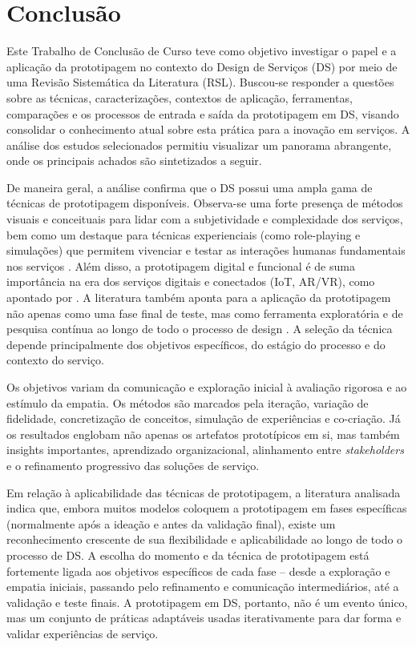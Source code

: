 \chapter[Conclusão]{Conclusão}

Este Trabalho de Conclusão de Curso teve como objetivo investigar o papel e a aplicação da prototipagem no contexto do Design de Serviços (DS) por meio de uma Revisão Sistemática da Literatura (RSL). Buscou-se responder a questões sobre as técnicas, caracterizações, contextos de aplicação, ferramentas, comparações e os processos de entrada e saída da prototipagem em DS, visando consolidar o conhecimento atual sobre esta prática para a inovação em serviços. A análise dos estudos selecionados permitiu visualizar um panorama abrangente, onde os principais achados são sintetizados a seguir.

De maneira geral, a análise confirma que o DS possui uma ampla gama de técnicas de prototipagem disponíveis. Observa-se uma forte presença de métodos visuais e conceituais para lidar com a subjetividade e complexidade dos serviços, bem como um destaque para técnicas experienciais (como role-playing e simulações) que permitem vivenciar e testar as interações humanas fundamentais nos serviços \cite{soto2023prototyping, seko2024transitions}. Além disso, a prototipagem digital e funcional é de suma importância na era dos serviços digitais e conectados (IoT, AR/VR), como apontado por . A literatura também aponta para a aplicação da prototipagem não apenas como uma fase final de teste, mas como ferramenta exploratória e de pesquisa contínua ao longo de todo o processo de design \cite{soto2023prototyping, paust2025integrative}. A seleção da técnica depende principalmente dos objetivos específicos, do estágio do processo e do contexto do serviço.

Os objetivos variam da comunicação e exploração inicial à avaliação rigorosa e ao estímulo da empatia. Os métodos são marcados pela iteração, variação de fidelidade, concretização de conceitos, simulação de experiências e co-criação. Já os resultados englobam não apenas os artefatos prototípicos em si, mas também insights importantes, aprendizado organizacional, alinhamento entre \textit{stakeholders} e o refinamento progressivo das soluções de serviço.

Em relação à aplicabilidade das técnicas de prototipagem, a literatura analisada indica que, embora muitos modelos coloquem a prototipagem em fases específicas (normalmente após a ideação e antes da validação final), existe um reconhecimento crescente de sua flexibilidade e aplicabilidade ao longo de todo o processo de DS. A escolha do momento e da técnica de prototipagem está fortemente ligada aos objetivos específicos de cada fase – desde a exploração e empatia iniciais, passando pelo refinamento e comunicação intermediários, até a validação e teste finais. A prototipagem em DS, portanto, não é um evento único, mas um conjunto de práticas adaptáveis usadas iterativamente para dar forma e validar experiências de serviço.

